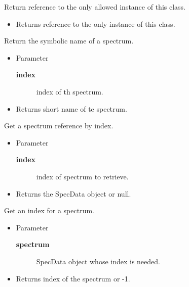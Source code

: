 \begin{desc}Return reference to the only allowed instance of this class.
\begin{itemize}
\item{Returns reference to the only instance of this class. }
\end{itemize}
\end{desc}

\begin{desc}Return the symbolic name of a spectrum.
\begin{itemize}
\item{Parameter
  \begin{description}
   \item[\textbf{index}]{index of th spectrum.}
  \end{description}}
\end{itemize}
\begin{itemize}
\item{Returns short name of te spectrum. }
\end{itemize}
\end{desc}

\begin{desc}Get a spectrum reference by index.
\begin{itemize}
\item{Parameter
  \begin{description}
   \item[\textbf{index}]{index of spectrum to retrieve.}
  \end{description}}
\end{itemize}
\begin{itemize}
\item{Returns the SpecData object or null. }
\end{itemize}
\end{desc}

\begin{desc}Get an index for a spectrum.
\begin{itemize}
\item{Parameter
  \begin{description}
   \item[\textbf{spectrum}]{SpecData object whose index is needed.}
  \end{description}}
\end{itemize}
\begin{itemize}
\item{Returns index of the spectrum or -1. }
\end{itemize}
\end{desc}

